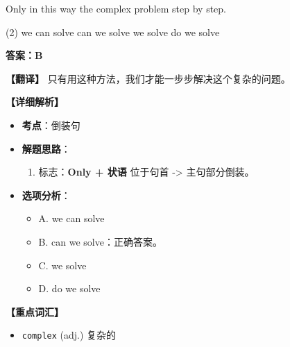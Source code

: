 \documentclass[11pt, a4paper]{article}
\newcommand{\analysis}[4]{
    \begin{solutionbox}
        \textbf{答案：#1}
        
        \textbf{【翻译】} #2
        
        \textbf{【详细解析】}
        #3
        
        \textbf{【重点词汇】}
        #4
    \end{solutionbox}
}
\newcommand{\blank}{\underline{\hspace{1.5cm}}}
\begin{document}
\begin{questions}
    \item Only in this way \blank the complex problem step by step.
    \begin{tasks}(2)
        \task we can solve \task can we solve
        \task we solve \task do we solve
    \end{tasks}
    \analysis{B}{只有用这种方法，我们才能一步步解决这个复杂的问题。}{
        \begin{itemize}
            \item \textbf{考点}：倒装句
            \item \textbf{解题思路}：
                \begin{enumerate}
                    \item 标志：\textbf{Only + 状语} 位于句首 -> 主句部分倒装。
                \end{enumerate}
            \item \textbf{选项分析}：
                \begin{itemize}
                    \item A. we can solve
                    \item B. can we solve：正确答案。
                    \item C. we solve
                    \item D. do we solve
                \end{itemize}
        \end{itemize}
    }{
        \begin{itemize}
            \item \texttt{complex} (adj.) 复杂的
        \end{itemize}
    }


\end{questions}
\end{document}
